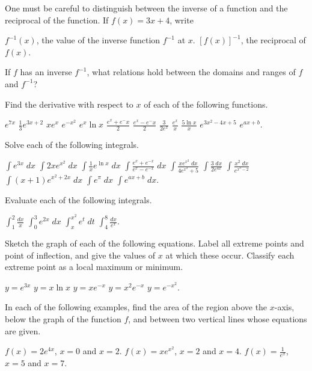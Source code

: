 \begin{exercises}

One must be careful to distinguish between the
inverse of a function and the reciprocal of the function.
If $f(x) = 3x + 4$, write
\begin{exenum}
\x
$f^{-1}(x)$, the value of the inverse function
$f^{-1}$ at $x$.
\x
$[f(x)]^{-1}$, the reciprocal of $f(x)$.
\end{exenum}

If $f$ has an inverse $f^{-1}$,
what relations hold between the domains and ranges
of $f$ and $f^{-1}$?

Find the derivative with respect to $x$
of each of the following functions.
\begin{exenum}
\x
$e^{7x}$
\x
$\frac13e^{3x+2}$
\x
$xe^x$
\x
$e^{-x^2}$
\x
$e^x \ln x$
\x
$\frac{e^x+e^-x}2$
\x
$\frac{e^x-e^-x}2$
\x
$\frac3{2e^x}$
\x
$\frac{e^x}x$
\x
$\frac{5\ln x}x$
\x
$e^{3x^2 - 4x + 5}$
\x
$e^{ax+b}$.
\end{exenum}

Solve each of the following integrals.
\begin{exenum}
\x
$\int e^{3x} \;dx$
\x
$\int 2xe^{x^2} \;dx$
\x
$\int \frac1x e^{\ln x} \;dx$
\x
$\int \frac{e^x + e^{-x}}{e^x - e^{-x}} \;dx$
\x
$\int \frac{xe^{x^2} \;dx}{4e^{x^2} + 5}$
\x
$\int \frac {3\;dx}{2e^{4x}}$
\x
$\int \frac {x^2\;dx}{e^{x^3-2}}$
\x
$\int (x+1) e^{x^2+2x} \; dx$
\x
$\int e^\pi \;dx$
\x
$\int e^{ax+b} \;dx$.
\end{exenum}

Evaluate each of the following integrals.
\begin{exenum}
\x
$\int_1^2 \frac{dx}x$
\x
$\int_0^3 e^{2x} \;dx$
\x
$\int_x^{x^2} e^t \; dt$
\x
$\int_4^8 \frac{dx}{e^x}$.
\end{exenum}

Sketch the graph of each of the following equations.
Label all extreme points and point of inflection,
and give the values of $x$ at which these occur.
Classify each extreme point as a local
maximum or minimum.
\begin{exenum}
\x
$y=e^{3x}$
\x
$y=x \ln x$
\x
$y = xe^{-x}$
\x
$y = x^2e^{-x}$
\x
$y = e^{-x^2}$.
\end{exenum}

In each of the following examples,
find the area of the region above the $x$-axis,
below the graph of the function $f$,
and between two vertical lines whose equations
are given.
\begin{exenum}
\x
$f(x) = 2e^{4x}$, $x=0$ and $x=2$.
\x
$f(x) = xe^{x^2}$, $x=2$ and $x=4$.
\x
$f(x) = \frac1{e^x}$, $x=5$ and $x=7$.
\end{exenum}


\end{exercises}
